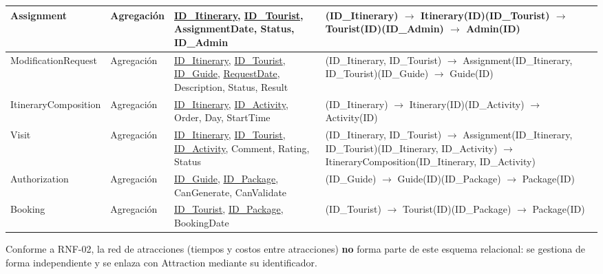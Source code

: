 \documentclass[11pt,a4paper]{article}
\begin{document}
{\begin{longtable}{|>{\raggedright\arraybackslash}p{2.88cm}|>{\raggedright\arraybackslash}p{2.35cm}|>{\raggedright\arraybackslash}p{5.00cm}|>{\raggedright\arraybackslash}p{5.07cm}|}
Assignment & Agregación & \underline{ID\_Itinerary}, \underline{ID\_Tourist}, AssignmentDate, Status, ID\_Admin & (ID\_Itinerary) \ensuremath{\rightarrow} Itinerary(ID)\newline{}(ID\_Tourist) \ensuremath{\rightarrow} Tourist(ID)\newline{}(ID\_Admin) \ensuremath{\rightarrow} Admin(ID) \\ \hline
ModificationRequest & Agregación & \underline{ID\_Itinerary}, \underline{ID\_Tourist}, \underline{ID\_Guide}, \underline{RequestDate}, Description, Status, Result & (ID\_Itinerary, ID\_Tourist) \ensuremath{\rightarrow} Assignment(ID\_Itinerary, ID\_Tourist)\newline{}(ID\_Guide) \ensuremath{\rightarrow} Guide(ID) \\ \hline
ItineraryComposition & Agregación & \underline{ID\_Itinerary}, \underline{ID\_Activity}, Order, Day, StartTime & (ID\_Itinerary) \ensuremath{\rightarrow} Itinerary(ID)\newline{}(ID\_Activity) \ensuremath{\rightarrow} Activity(ID) \\ \hline
Visit & Agregación & \underline{ID\_Itinerary}, \underline{ID\_Tourist}, \underline{ID\_Activity}, Comment, Rating, Status & (ID\_Itinerary, ID\_Tourist) \ensuremath{\rightarrow} Assignment(ID\_Itinerary, ID\_Tourist)\newline{}(ID\_Itinerary, ID\_Activity) \ensuremath{\rightarrow} ItineraryComposition(ID\_Itinerary, ID\_Activity) \\ \hline
Authorization & Agregación & \underline{ID\_Guide}, \underline{ID\_Package}, CanGenerate, CanValidate & (ID\_Guide) \ensuremath{\rightarrow} Guide(ID)\newline{}(ID\_Package) \ensuremath{\rightarrow} Package(ID) \\ \hline
Booking & Agregación & \underline{ID\_Tourist}, \underline{ID\_Package}, BookingDate & (ID\_Tourist) \ensuremath{\rightarrow} Tourist(ID)\newline{}(ID\_Package) \ensuremath{\rightarrow} Package(ID) \\ \hline
\end{longtable}}
\vspace{2pt}
Conforme a RNF-02, la red de atracciones (tiempos y costos entre atracciones) \textbf{no} forma parte de este esquema relacional: se gestiona de forma independiente y se enlaza con Attraction mediante su identificador.
\end{document}
